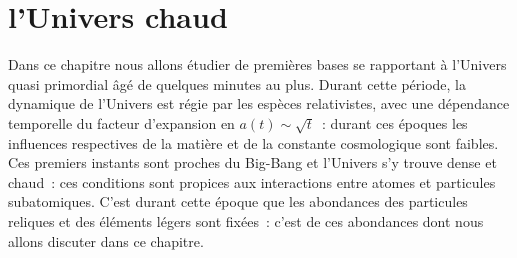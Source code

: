 
\chapter{l'Univers chaud}
Dans ce chapitre nous allons étudier de premières bases se rapportant à l'Univers quasi primordial âgé de quelques minutes au plus. Durant cette période, la dynamique de l'Univers est régie par les espèces relativistes, avec une dépendance temporelle du facteur d'expansion en $a(t)\sim\sqrt{t}$~: durant ces époques les influences respectives de la matière et de la constante cosmologique sont faibles. Ces premiers instants sont proches du Big-Bang et l'Univers s'y trouve dense et chaud~: ces conditions sont propices aux interactions entre atomes et particules subatomiques. C'est durant cette époque que les abondances des particules reliques et des éléments légers sont fixées~: c'est de ces abondances dont nous allons discuter dans ce chapitre.


